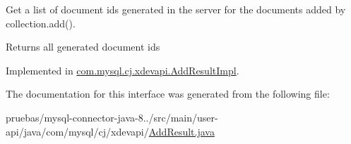 Get a list of document ids generated in the server for the documents added by collection.\+add().

\begin{DoxyReturn}{Returns}
all generated document ids 
\end{DoxyReturn}


Implemented in \mbox{\hyperlink{classcom_1_1mysql_1_1cj_1_1xdevapi_1_1_add_result_impl_a61db638035bc38725440e27d51dc1ef8}{com.\+mysql.\+cj.\+xdevapi.\+Add\+Result\+Impl}}.



The documentation for this interface was generated from the following file\+:\begin{DoxyCompactItemize}
\item 
pruebas/mysql-\/connector-\/java-\/8../src/main/user-\/api/java/com/mysql/cj/xdevapi/\mbox{\hyperlink{_add_result_8java}{Add\+Result.\+java}}\end{DoxyCompactItemize}
